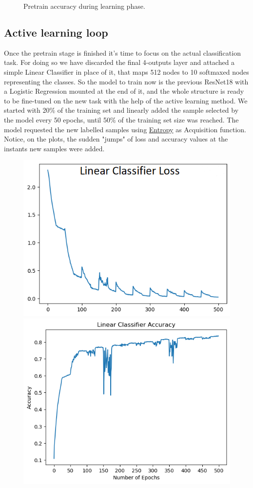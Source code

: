 \documentclass{article}
\begin{document}
\begin{flushleft}
\begin{figure}[h]
    \caption{ Pretrain accuracy during learning phase.}
\end{figure}
\subsection{Active learning loop}
Once the pretrain stage is finished it's time to focus on the actual classification task.
 For doing so we have discarded the final 4-outputs layer and attached a simple Linear Classifier in place of it, 
that maps 512 nodes to 10 softmaxed nodes representing the classes.
So the model to train now is the previous ResNet18 with a Logistic Regression mounted at the end of it, and the whole structure is 
ready to be fine-tuned on the new task with the help of the active learning method.
We started with 20\% of the training set and linearly added the sample selected by the model every 50 epochs, until 50\% of the training set size was reached. The model requested the new labelled samples
using \hyperref[sec:entropy]{Entropy} as Acquisition function. Notice, on the plots, the sudden "jumps" of loss and accuracy values at the instants new samples were added.
\begin{figure}[h]
    \centering
    \includegraphics[scale=1.25]{lcsl_500_20_50_loss}
    \includegraphics[scale=0.65]{lcsl_500_20_50_acc}

\end{figure}
\end{flushleft}
\end{document}
